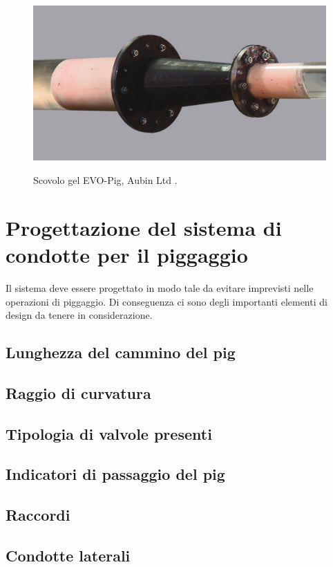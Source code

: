 \begin{figure}[htbp]
	\centering
	\includegraphics[width=\textwidth]{fig/pig/gelpig}
	\label{fig:gelpig}
	\caption{Scovolo gel EVO-Pig, Aubin Ltd \parencite{johnston2015breaking}.}
\end{figure}



\section{Progettazione del sistema di condotte per il piggaggio}
Il sistema deve essere progettato in modo tale da evitare imprevisti nelle operazioni di piggaggio. Di conseguenza ci sono degli importanti elementi di design da tenere in considerazione.
\subsection{Lunghezza del cammino del pig}
\subsection{Raggio di curvatura}
\subsection{Tipologia di valvole presenti}
\subsection{Indicatori di passaggio del pig}
\subsection{Raccordi}
\subsection{Condotte laterali}
